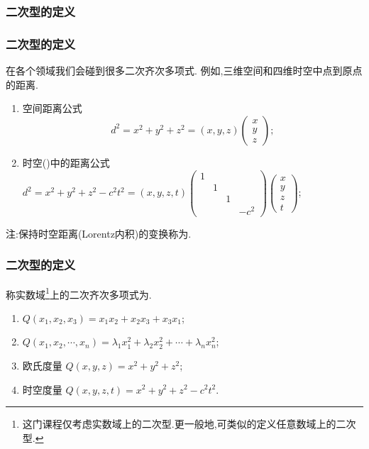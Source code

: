 \subsubsection{二次型的定义}
\begin{frame}\frametitle{二次型的定义}
在各个领域我们会碰到很多二次齐次多项式.
\pp
例如,三维空间和四维时空中点到原点的距离.
\pp
\begin{example}
\begin{enumerate}
\item 空间距离公式 \[d^2=x^2+y^2+z^2=(x,y,z)\begin{pmatrix}x\\y\\z\end{pmatrix};\]
\pp
\item 时空()中的距离公式 $d^2=x^2+y^2+z^2-c^2t^2=(x,y,z,t)\begin{pmatrix}1&&&\\&1&&\\&&1&\\&&&-c^2\end{pmatrix}\begin{pmatrix}x\\y\\z\\t\end{pmatrix}$;
\end{enumerate}
\end{example}
\pp
注:保持时空距离(Lorentz内积)的变换称为.
\end{frame}





\begin{frame}\frametitle{二次型的定义}
\begin{definition}[(实)二次型]
称实数域\footnote{这门课程仅考虑实数域上的二次型.更一般地,可类似的定义任意数域上的二次型.}上的二次齐次多项式为.
\end{definition}
\pp
\begin{example}
\begin{enumerate}
\item $Q(x_1,x_2,x_3)=x_1x_2+x_2x_3+x_3x_1$;
\pp
\item $Q(x_1,x_2,\cdots,x_n)=\lambda_1x_1^2+\lambda_2x_2^2+\cdots+\lambda_nx_n^2$;
\pp
\item 欧氏度量 $Q(x,y,z)=x^2+y^2+z^2$;
\pp
\item 时空度量 $Q(x,y,z,t)=x^2+y^2+z^2-c^2t^2$.
\end{enumerate}
\end{example}
\end{frame}





